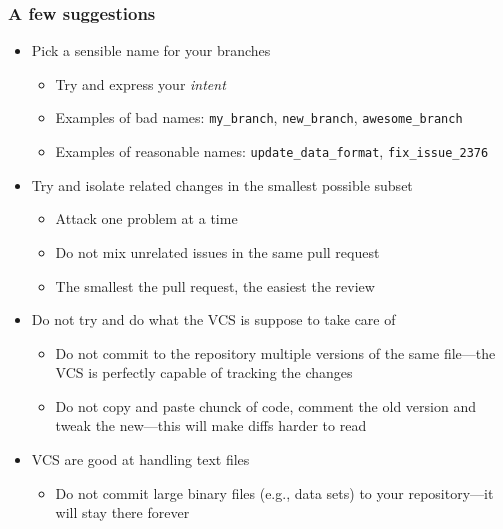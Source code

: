 \documentclass[9pt]{beamer}
\begin{document}
\begin{frame}[fragile]
  \frametitle{A few suggestions}
  \begin{itemize}
  \item Pick a sensible name for your branches
    \begin{itemize}
    \item Try and express your \emph{intent}
    \item Examples of bad names: \verb|my_branch|, \verb|new_branch|,
      \verb|awesome_branch|
    \item Examples of reasonable names: \verb|update_data_format|,
      \verb|fix_issue_2376|
    \end{itemize}
  \item Try and isolate related changes in the smallest possible subset
    \begin{itemize}
    \item Attack one problem at a time
    \item Do not mix unrelated issues in the same pull request
    \item The smallest the pull request, the easiest the review
    \end{itemize}
  \item Do not try and do what the VCS is suppose to take care of
    \begin{itemize}
    \item Do not commit to the repository multiple versions of the same
      file---the VCS is perfectly capable of tracking the changes
    \item Do not copy and paste chunck of code, comment the old version and
      tweak the new---this will make diffs harder to read
    \end{itemize}
  \item VCS are good at handling text files
    \begin{itemize}
    \item Do not commit large binary files (e.g., data sets) to your
      repository---it will stay there forever
    \end{itemize}
  \end{itemize}
\end{frame}
\end{document}
